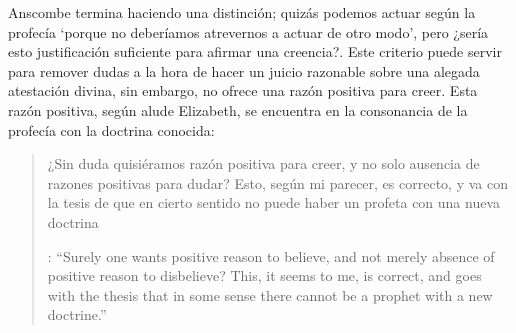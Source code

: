 Anscombe termina haciendo una distinción; quizás podemos actuar según la profecía \enquote*{porque no deberíamos atrevernos a actuar de otro modo}, pero ¿sería esto justificación suficiente para afirmar una creencia?. Este criterio puede servir para remover dudas a la hora de hacer un juicio razonable sobre una alegada atestación divina, sin embargo, no ofrece una razón positiva para creer. Esta razón positiva, según alude Elizabeth, se encuentra en la consonancia de la profecía con la doctrina conocida: \blockquote[{\cite[39]{anscombe2008faith:prophandmi}}: \enquote{Surely one wants positive reason to believe, and not merely absence of positive reason to disbelieve? This, it seems to me, is correct, and goes with the thesis that in some sense there cannot be a prophet with a new doctrine.}]{¿Sin duda quisiéramos razón positiva para creer, y no solo ausencia de razones positivas para dudar? Esto, según mi parecer, es correcto, y va con la tesis de que en cierto sentido no puede haber un profeta con una nueva doctrina}.
